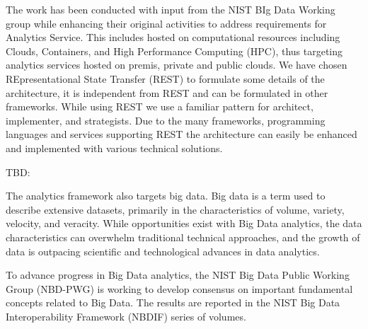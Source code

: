 The work has been conducted with input from the NIST BIg Data Working
group while enhancing their original activities to address
requirements for Analytics Service. This includes hosted on
computational resources including Clouds, Containers, and High
Performance Computing (HPC), thus targeting analytics services hosted
on premis, private and public clouds. We have chosen REpresentational
State Transfer (REST) to formulate some details of the architecture,
it is independent from REST and can be formulated in other
frameworks. While using REST we use a familiar pattern for architect,
implementer, and strategists. Due to the many frameworks, programming
languages and services supporting REST the architecture can easily be
enhanced and implemented with various technical solutions.


TBD:

The
analytics framework also targets big data.
Big data is a term used to
describe extensive datasets, primarily in the characteristics of
volume, variety, velocity, and veracity. While opportunities exist
with Big Data analytics, the data characteristics can overwhelm
traditional technical approaches, and the growth of data is outpacing
scientific and technological advances in data analytics.

To advance
progress in Big Data analytics, the NIST Big Data Public Working Group
(NBD-PWG) is working to develop consensus on important fundamental
concepts related to Big Data. The results are reported in the NIST Big
Data Interoperability Framework (NBDIF) series of volumes.

